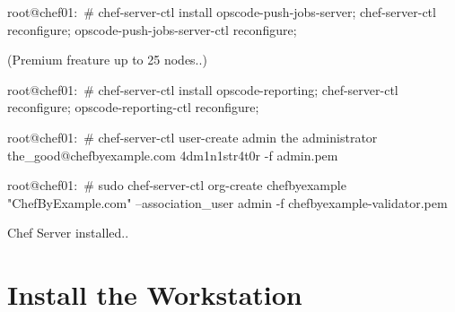 \begin{codelisting}
\label{code:}
\codecaption{}
\begin{code}
root@chef01:~# chef-server-ctl install opscode-push-jobs-server; chef-server-ctl reconfigure; opscode-push-jobs-server-ctl reconfigure;
\end{code}
\end{codelisting}


(Premium freature up to 25 nodes..)
\begin{codelisting}
\label{code:}
\codecaption{}
\begin{code}
root@chef01:~# chef-server-ctl install opscode-reporting; chef-server-ctl reconfigure; opscode-reporting-ctl reconfigure; 
\end{code}
\end{codelisting}


\begin{codelisting}
\label{code:}
\codecaption{}
\begin{code}
root@chef01:~# chef-server-ctl user-create admin the administrator the_good@chefbyexample.com 4dm1n1str4t0r -f admin.pem
\end{code}
\end{codelisting}


\begin{codelisting}
\label{code:}
\codecaption{}
\begin{code}
root@chef01:~# sudo chef-server-ctl org-create chefbyexample "ChefByExample.com" --association_user admin -f chefbyexample-validator.pem
\end{code}
\end{codelisting}


Chef Server installed..

\section{Install the Workstation}

